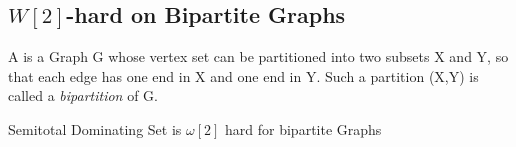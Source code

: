 \subsection{\hmath $W[2]$-hard on Bipartite Graphs}

\begin{definition}
    
A \textit{\bg} is a Graph G whose vertex set can be partitioned into two subsets X and Y, so that each edge has one end in X and one end in Y. Such a partition (X,Y) is called a \textit{bipartition} of G.

\end{definition}


\begin{theorem}
    Semitotal Dominating Set is $\omega[2]$ hard for bipartite Graphs
\end{theorem}

